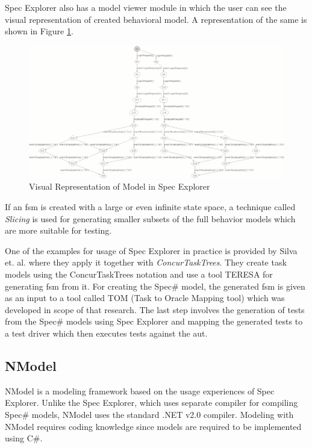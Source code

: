 \par
Spec Explorer also has a model viewer module in which the user can see the visual representation of created behavioral model. A representation of the same is shown in Figure \ref{Fig:Model_View_In_SpecExplorer}.

\begin{figure} [t]
	\centering
					\includegraphics[width=1\textwidth]{figures/Model_View_In_SpecExplorer.png}
					\caption{\label{Fig:Model_View_In_SpecExplorer} Visual Representation of Model in Spec Explorer \cite{SpecExplorer_ModelView}}
\end{figure}

\par
If an \acrshort{fsm} is created with a large or even infinite state space, a technique called \textit{Slicing} is used for generating smaller subsets of the full behavior models which are more suitable for testing.

\par
One of the examples for usage of Spec Explorer in practice is provided by Silva et. al. \cite{Silva_SpecExplorer} where they apply it together with \textit{ConcurTaskTrees}. They create task models using the ConcurTaskTrees notation
and use a tool TERESA for generating \acrshort{fsm} from it. For creating the Spec\# model, the generated \acrshort{fsm} is given as an input to a tool called TOM (Task to Oracle Mapping tool) which was developed in scope of that research. The last step involves the generation of tests from the Spec\# models using Spec Explorer and mapping the generated tests to a test driver which then executes tests against the \acrshort{aut}.

\subsection{NModel}
\par
NModel is a modeling framework based on the usage experiences of Spec Explorer. Unlike the Spec Explorer, which uses separate compiler for compiling Spec\# models, NModel uses the standard .NET v2.0 compiler. Modeling with NModel requires coding knowledge since models are required to be implemented using C\#.

